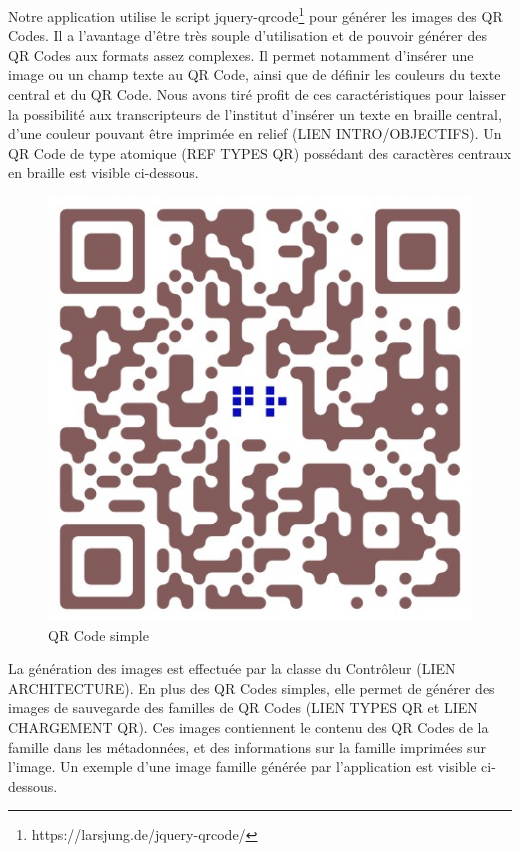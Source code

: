 \par
Notre application utilise le script jquery-qrcode\footnote{https://larsjung.de/jquery-qrcode/} pour générer les images des QR Codes. Il a l'avantage d'être très souple d'utilisation et de pouvoir générer des QR Codes aux formats assez complexes. Il permet notamment d'insérer une image ou un champ texte au QR Code, ainsi que de définir les couleurs du texte central et du QR Code. Nous avons tiré profit de ces caractéristiques pour laisser la possibilité aux transcripteurs de l'institut d'insérer un texte en braille central, d'une couleur pouvant être imprimée en relief (LIEN INTRO/OBJECTIFS). Un QR Code de type atomique (REF TYPES QR) possédant des caractères centraux en braille est visible ci-dessous.\\

\begin{figure}[]
	\centering
   \includegraphics[scale=0.25]{img/qrsimple.jpeg}
   \caption{QR Code simple}
\end{figure}

\par
La génération des images est effectuée par la classe du Contrôleur  (LIEN ARCHITECTURE). En plus des QR Codes simples, elle permet de générer des images de sauvegarde des familles de QR Codes (LIEN TYPES QR et LIEN CHARGEMENT QR). Ces images contiennent le contenu des QR Codes de la famille dans les métadonnées, et des informations sur la famille imprimées sur l'image. Un exemple d'une image famille générée par l'application est visible ci-dessous.

